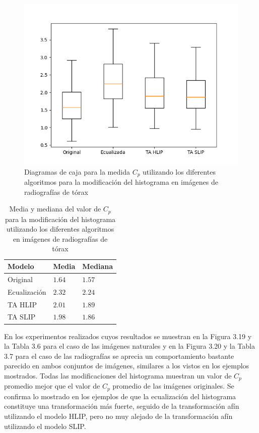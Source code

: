 \begin{figure}
	\begin{center}
		\includegraphics[width=10.0 cm]{images/graphics/torax/affine_transform/eq_all.png}
		\caption{Diagramas de caja para la medida $C_p$ utilizando los diferentes algoritmos para la modificaci\'on del histograma en im\'agenes de radiograf\'ias de t\'orax}
	\end{center}
\end{figure}

\begin{table}
	\begin{center}
		\begin{tabular}{|l|l|l|}
			\hline 
			Modelo & Media & Mediana\\
			\hline
			Original & $1.64$ & $1.57$\\
			\hline
			Ecualizaci\'on & $2.32$ & $2.24$\\
			\hline
			TA HLIP & $2.01$ & $1.89$\\
			\hline
			TA SLIP & $1.98$ & $1.86$\\
			\hline
		\end{tabular}
		\caption{Media y mediana del valor de $C_p$ para la modificaci\'on del histograma utilizando los diferentes algoritmos en im\'agenes de radiograf\'ias de t\'orax}
	\end{center}
\end{table}

En los experimentos realizados cuyos resultados se muestran en la Figura 3.19 y la Tabla 3.6 para el caso de las im\'agenes naturales y en la Figura 3.20 y la Tabla 3.7 para el caso de las radiograf\'ias se aprecia un comportamiento bastante parecido en ambos conjuntos de im\'agenes, similares a los vistos en los ejemplos mostrados. Todas las modificaciones del histograma muestran un valor de $C_p$ promedio mejor que el valor de $C_p$ promedio de las im\'agenes originales. Se confirma lo mostrado en los ejemplos de que la ecualizaci\'on del histograma constituye una transformaci\'on m\'as fuerte, seguido de la transformaci\'on af\'in utilizando el modelo HLIP, pero no muy alejado de la transformaci\'on af\'in  utilizando el modelo SLIP.

